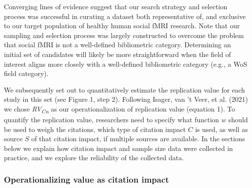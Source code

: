 \documentclass[
  man,floatsintext]{apa6}
\begin{document}
Converging lines of evidence suggest that our search strategy and selection process was successful in curating a dataset both representative of, and exclusive to our target population of healthy human social fMRI research. Note that our sampling and selection process was largely constructed to overcome the problem that social fMRI is not a well-defined bibliometric category. Determining an initial set of candidates will likely be more straightforward when the field of interest aligns more closely with a well-defined bibliometric category (e.g., a WoS field category).

We subsequently set out to quantitatively estimate the replication value for each study in this set (see Figure 1, step 2). Following Isager, van 't Veer, et al. (2021) we chose \emph{RV\textsubscript{Cn}} as our operationalization of replication value (equation 1). To quantify the replication value, researchers need to specify what function \(w\) should be used to weigh the citations, which type of citation impact \(C\) is used, as well as source \(S\) of that citation impact, if multiple sources are available. In the sections below we explain how citation impact and sample size data were collected in practice, and we explore the reliability of the collected data.

\hypertarget{operationalizing-value-as-citation-impact}{%
\subsubsection{Operationalizing value as citation impact}\label{operationalizing-value-as-citation-impact}}
\end{document}
